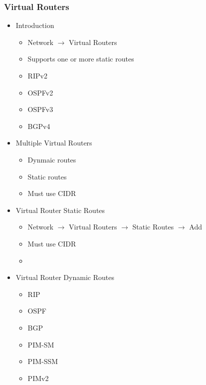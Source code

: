 \subsubsection{Virtual Routers}
    \begin{itemize}
        \item Introduction
            \begin{itemize}
                \item Network $\rightarrow$ Virtual Routers
                \item Supports one or more static routes
                \item RIPv2
                \item OSPFv2
                \item OSPFv3
                \item BGPv4
            \end{itemize}
        \item Multiple Virtual Routers
            \begin{itemize}
                \item Dynmaic routes
                \item Static routes
                \item Must use CIDR
            \end{itemize}
        \item Virtual Router Static Routes
            \begin{itemize}
                \item Network $\rightarrow$ Virtual Routers $\rightarrow$ Static Routes $\rightarrow$ Add
                \item Must use CIDR
                \item 
            \end{itemize}
        \item Virtual Router Dynamic Routes
            \begin{itemize}
                \item RIP
                \item OSPF
                \item BGP
                \item PIM-SM
                \item PIM-SSM
                \item PIMv2
            \end{itemize}
    \end{itemize}

